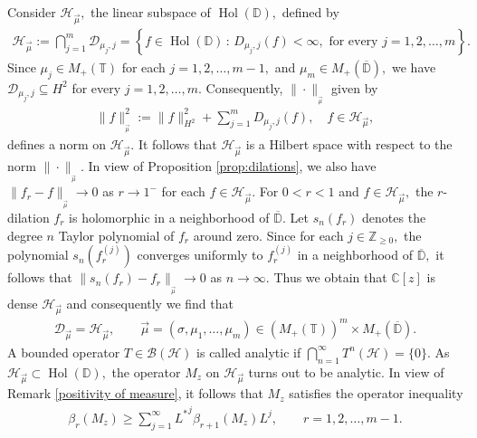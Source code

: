 \documentclass[10pt,oneside,reqno]{amsart}
\theoremstyle{definition}
\theoremstyle{remark}
\newcommand{\D}{\mathbb D}
\numberwithin{equation}{section}
\begin{document}
 Consider $\mathscr H_{\overrightarrow{\mu}},$ the linear subspace of $\operatorname{Hol} (\D),$ defined by 
\begin{align*}
   \mathscr H_{\overrightarrow{\mu}}:= \bigcap\limits_{j=1}^m \mathscr D_{\mu_j,j} = \left \{ f \in \operatorname{Hol} (\D) \, : \, D_{\mu_j, j} (f) < \infty, \,\,\mbox{for every} \,\,j=1,2,\ldots,m\right \}.
 \end{align*}
Since $\mu_j\in M_+(\mathbb T)$ for each $j=1,2,\ldots,m-1,$ and $\mu_m\in M_+(\overline{\D}),$ we have $\mathscr D_{\mu_j,j}\subseteq H^2$ for every $j=1,2,\ldots,m.$ Consequently, $\|\cdot \|_{_{\overrightarrow{\mu}}}$ given by 
\begin{align*}
    \|f\|^2_{_{\overrightarrow{\mu}}}:= \|f\|_{H^2}^2+ \sum\limits_{j=1}^{m} D_{\mu_j,j}(f), \quad f\in  \mathscr H_{\overrightarrow{\mu}},
\end{align*}
defines a norm on $\mathscr H_{\overrightarrow{\mu}}.$ It follows that $\mathscr H_{\overrightarrow{\mu}}$ is a Hilbert space with respect to the norm $\|\cdot \|_{_{\overrightarrow{\mu}}}.$ In view of Proposition \ref{prop:dilations}, we also have  $\|f_r-f\|_{_{\overrightarrow{\mu}}} \to 0$ as $r\to 1^{-}$ for each $f\in\mathscr H_{\overrightarrow{\mu}}.$ For $0<r <1$ and $f\in \mathscr H_{\overrightarrow{\mu}},$ the $r$-dilation $f_r$ is holomorphic in a neighborhood of $\overline{\D}.$ Let $s_n(f_r)$ denotes the degree $n$ Taylor polynomial of $f_r$ around zero. Since for each $j\in \mathbb Z_{\geqslant 0},$ the polynomial $s_n(f_r^{(j)})$ converges uniformly to $f_r^{(j)}$ in a neighborhood of $\overline{\D},$ it follows that $\|s_n(f_r)-f_r\|_{_{\overrightarrow{\mu}}} \to 0$ as $n\to \infty.$ Thus we obtain that $\mathbb C[z]$ is dense $\mathscr H_{\overrightarrow{\mu}}$ and consequently we find that 
\begin{align*}
   \mathscr D_{\overrightarrow{\mu}}=\mathscr H_{\overrightarrow{\mu}},\qquad  \overrightarrow{\mu} = \left( \sigma, \mu_{1}, \ldots ,\mu_{m} \right) \in \left(M_+(\mathbb T)\right) ^m \times M_+(\overline{\D}).
\end{align*}
A bounded operator $T\in \mathcal B(\mathcal H)$ is called analytic if $\bigcap\limits_{n=1}^{\infty} T^n(\mathcal H)= \{0\}.$
As $\mathscr H_{\overrightarrow{\mu}}\subset \operatorname{Hol} (\D),$ the operator $M_z$ on $\mathscr H_{\overrightarrow{\mu}}$ turns out to be analytic. In view of Remark \ref{positivity of measure}, it follows that $M_z$ satisfies the operator inequality
\begin{align*}
    \beta_r(M_z)\geqslant \sum\limits_{j=1}^{\infty} {L^{*}}^j \beta_{r+1}(M_z) {L}^j,\qquad r=1,2,\ldots,m-1.
\end{align*}
\end{document}
